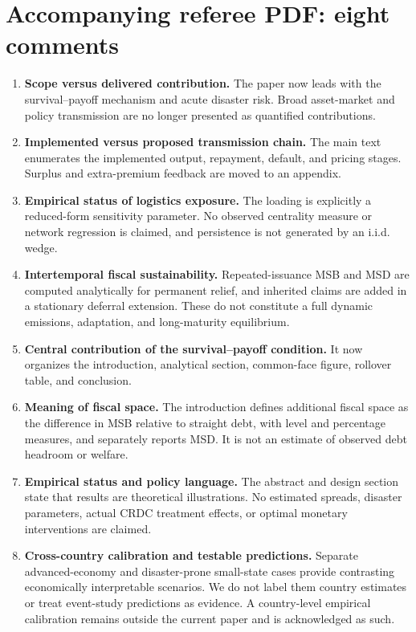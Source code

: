 \documentclass[11pt]{article}
\begin{document}
\section*{Accompanying referee PDF: eight comments}
\begin{enumerate}
\item \textbf{Scope versus delivered contribution.} The paper now leads with the survival--payoff mechanism and acute disaster risk. Broad asset-market and policy transmission are no longer presented as quantified contributions.
\item \textbf{Implemented versus proposed transmission chain.} The main text enumerates the implemented output, repayment, default, and pricing stages. Surplus and extra-premium feedback are moved to an appendix.
\item \textbf{Empirical status of logistics exposure.} The loading is explicitly a reduced-form sensitivity parameter. No observed centrality measure or network regression is claimed, and persistence is not generated by an i.i.d. wedge.
\item \textbf{Intertemporal fiscal sustainability.} Repeated-issuance MSB and MSD are computed analytically for permanent relief, and inherited claims are added in a stationary deferral extension. These do not constitute a full dynamic emissions, adaptation, and long-maturity equilibrium.
\item \textbf{Central contribution of the survival--payoff condition.} It now organizes the introduction, analytical section, common-face figure, rollover table, and conclusion.
\item \textbf{Meaning of fiscal space.} The introduction defines additional fiscal space as the difference in MSB relative to straight debt, with level and percentage measures, and separately reports MSD. It is not an estimate of observed debt headroom or welfare.
\item \textbf{Empirical status and policy language.} The abstract and design section state that results are theoretical illustrations. No estimated spreads, disaster parameters, actual CRDC treatment effects, or optimal monetary interventions are claimed.
\item \textbf{Cross-country calibration and testable predictions.} Separate advanced-economy and disaster-prone small-state cases provide contrasting economically interpretable scenarios. We do not label them country estimates or treat event-study predictions as evidence. A country-level empirical calibration remains outside the current paper and is acknowledged as such.
\end{enumerate}
\end{document}
